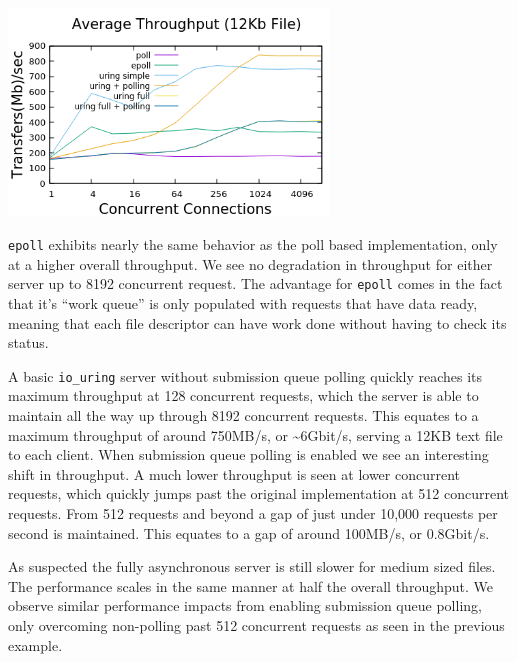 \documentclass[letterpaper, 10pt, twocolumn]{article}
\begin{document}
\begin{center}
\includegraphics[width=3.35in]{med_throughput.png}
\end{center}

\texttt{epoll} exhibits nearly the same behavior as the poll based implementation, only at a higher overall throughput. We see no degradation in throughput for either server up to 8192 concurrent request. The advantage for \texttt{epoll} comes in the fact that it's ``work queue'' is only populated with requests that have data ready, meaning that each file descriptor can have work done without having to check its status.

A basic \texttt{io\_uring} server without submission queue polling quickly reaches its maximum throughput at 128 concurrent requests, which the server is able to maintain all the way up through 8192 concurrent requests. This equates to a maximum throughput of around 750MB/s, or \textasciitilde{}6Gbit/s, serving a 12KB text file to each client. When submission queue polling is enabled we see an interesting shift in throughput. A much lower throughput is seen at lower concurrent requests, which quickly jumps past the original implementation at 512 concurrent requests. From 512 requests and beyond a gap of just under 10,000 requests per second is maintained. This equates to a gap of around 100MB/s, or 0.8Gbit/s.

As suspected the fully asynchronous server is still slower for medium sized files. The performance scales in the same manner at half the overall throughput. We observe similar performance impacts from enabling submission queue polling, only overcoming non-polling past 512 concurrent requests as seen in the previous example.
\end{document}
